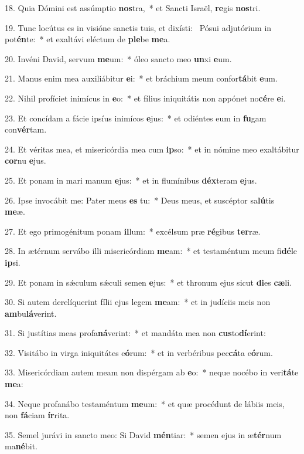 18. Quia Dómini est assúmptio \textbf{nos}tra,~*  et Sancti Israël, \textbf{re}gis \textbf{nos}tri.\

19. Tunc locútus es in visióne sanctis tuis, et dixísti: \dag\  Pósui adjutórium in pot\textbf{én}te:~*  et exaltávi eléctum de \textbf{ple}be \textbf{me}a.\

20. Invéni David, servum \textbf{me}um:~*  óleo sancto meo \textbf{un}xi \textbf{e}um.\

21. Manus enim mea auxiliábitur \textbf{e}i:~*  et bráchium meum confor\textbf{tá}bit \textbf{e}um.\

22. Nihil profíciet inimícus in \textbf{e}o:~*  et fílius iniquitátis non appónet no\textbf{cé}re \textbf{e}i.\

23. Et concídam a fácie ipsíus inimícos \textbf{e}jus:~*  et odiéntes eum in \textbf{fu}gam con\textbf{vér}tam.\

24. Et véritas mea, et misericórdia mea cum \textbf{ip}so:~*  et in nómine meo exaltábitur \textbf{cor}nu \textbf{e}jus.\

25. Et ponam in mari manum \textbf{e}jus:~*  et in flumínibus \textbf{déx}teram \textbf{e}jus.\

26. Ipse invocábit me: Pater meus \textbf{es} tu:~*  Deus meus, et suscéptor sa\textbf{lú}tis \textbf{me}æ.\

27. Et ego primogénitum ponam \textbf{il}lum:~*  excélsum præ \textbf{ré}gibus \textbf{ter}ræ.\

28. In ætérnum servábo illi misericórdiam \textbf{me}am:~*  et testaméntum meum fi\textbf{dé}le \textbf{ip}si.\

29. Et ponam in sǽculum sǽculi semen \textbf{e}jus:~*  et thronum ejus sicut \textbf{di}es \textbf{cæ}li.\

30. Si autem derelíquerint fílii ejus legem \textbf{me}am:~*  et in judíciis meis non \textbf{am}bu\textbf{lá}verint.\

31. Si justítias meas profa\textbf{ná}verint:~*  et mandáta mea non \textbf{cus}to\textbf{dí}erint:\

32. Visitábo in virga iniquitátes e\textbf{ó}rum:~*  et in verbéribus pec\textbf{cá}ta e\textbf{ó}rum.\

33. Misericórdiam autem meam non dispérgam ab \textbf{e}o:~*  neque nocébo in veri\textbf{tá}te \textbf{me}a:\

34. Neque profanábo testaméntum \textbf{me}um:~*  et quæ procédunt de lábiis meis, non \textbf{fá}ciam \textbf{ír}rita.\

35. Semel jurávi in sancto meo: Si David \textbf{mén}tiar:~*  semen ejus in æ\textbf{tér}num ma\textbf{né}bit.\

